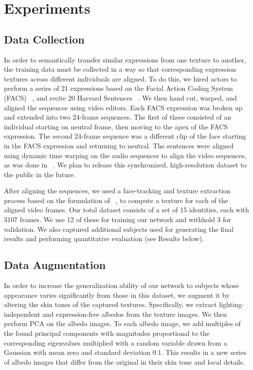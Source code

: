 
\section{Experiments}

\subsection{Data Collection}

In order to semantically transfer similar expressions from one texture to another, the training data must be collected in a way so that 
corresponding expression textures across different individuals are aligned.  To do this, we hired actors to perform a series of 21 expressions based on the Facial Action Coding System (FACS) ~\cite{Ekman:1978}, and recite 20 Harvard Sentences ~\cite{HarvardSent:1969}. We then hand cut, warped, and aligned the sequences using video editors.  Each FACS expression was broken
up and extended into two 24-frame sequences.  The first of these consisted of an individual starting on neutral frame, then moving to the apex of the FACS expression.
The second 24-frame sequence was a different clip of the face starting in the FACS expression and returning to neutral.  The sentences were aligned
using dynamic time warping on the audio sequences to align the video sequences, as was done in ~\cite{olszewski2016high}. We plan to release this synchronized, high-resolution dataset to the public in the future. 

After aligning the sequences, we used a face-tracking and texture extraction process based on the formulation of ~\cite{f2f}, to compute a texture
for each of the aligned video frames. Our total dataset consists of a set of 15 identities, each with 3107 frames. We use 12 of these for training our network and withhold 3 for validation. We also captured additional subjects used for generating the final results and performing quantitative evaluation (see Results below).

\subsection{Data Augmentation}
In order to increase the generalization ability of our network to subjects whose appearance varies significantly from those in this dataset, we augment it by altering the skin tones of the captured textures. Specifically, we extract lighting-independent and expression-free albedos from the texture images.
We then perform PCA on the albedo images. To each albedo image, we add multiples of the found principal components with magnitudes proportional to the corresponding eigenvalues multiplied with a random variable drawn from a Gaussian with mean zero and standard deviation 0.1. This results in a new series of albedo images that differ from the original in their skin tone and local details.

